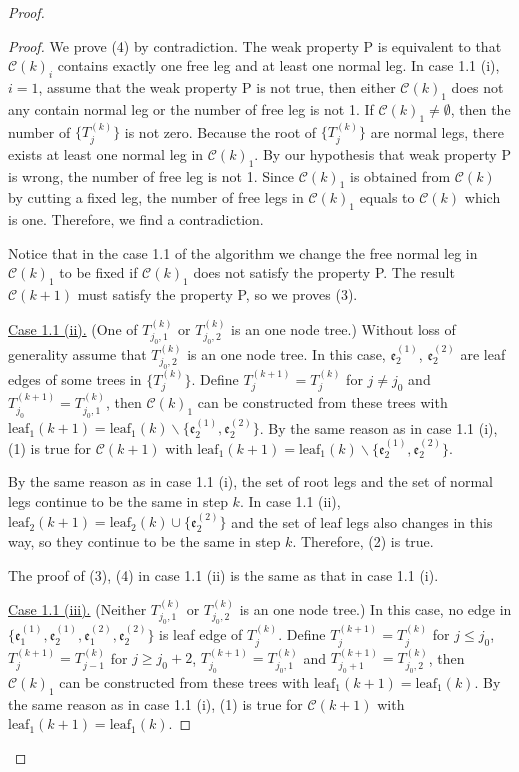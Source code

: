\begin{proof}
\begin{proof}
We prove (4) by contradiction. The weak property P is equivalent to that $\mathcal{C}(k)_i$ contains exactly one free leg and at least one normal leg. In case 1.1 (i), $i=1$, assume that the weak property P is not true, then either $\mathcal{C}(k)_1$ does not any contain normal leg or the number of free leg is not 1. If $\mathcal{C}(k)_1\ne \emptyset$, then the number of $\{T^{(k)}_{j}\}$ is not zero. Because the root of $\{T^{(k)}_{j}\}$ are normal legs, there exists at least one normal leg in $\mathcal{C}(k)_1$. By our hypothesis that weak property P is wrong, the number of free leg is not 1. Since $\mathcal{C}(k)_1$ is obtained from $\mathcal{C}(k)$ by cutting a fixed leg, the number of free legs in $\mathcal{C}(k)_1$ equals to  $\mathcal{C}(k)$ which is one. Therefore, we find a contradiction.

Notice that in the case 1.1 of the algorithm we change the free normal leg in $\mathcal{C}(k)_1$ to be fixed if $\mathcal{C}(k)_1$ does not satisfy the property P. The result $\mathcal{C}(k+1)$ must satisfy the property P, so we proves (3). 

\underline{Case 1.1 (ii).} (One of $T^{(k)}_{j_0,1}$ or $T^{(k)}_{j_0,2}$ is an one node tree.) Without loss of generality assume that $T^{(k)}_{j_0,2}$ is an one node tree. In this case, $\mathfrak{e}_{2}^{(1)}$, $\mathfrak{e}_{2}^{(2)}$ are leaf edges of some trees in $\{T_{j}^{(k)}\}$. Define $T^{(k+1)}_{j}=T^{(k)}_{j}$ for $j\ne j_0$ and $T^{(k+1)}_{j_0}=T^{(k)}_{j_0,1}$, then $\mathcal{C}(k)_1$ can be constructed from these trees with  $\text{leaf}_1(k+1)=\text{leaf}_1(k)\backslash\{\mathfrak{e}_{2}^{(1)}, \mathfrak{e}_{2}^{(2)}\}$. By the same reason as in case 1.1 (i), (1) is true for $\mathcal{C}(k+1)$ with $\text{leaf}_1(k+1)=\text{leaf}_1(k)\backslash\{\mathfrak{e}_{2}^{(1)}, \mathfrak{e}_{2}^{(2)}\}$.

By the same reason as in case 1.1 (i), the set of root legs and the set of normal legs continue to be the same in step $k$. In case 1.1 (ii), $\text{leaf}_2(k+1)=\text{leaf}_2(k)\cup \{ \mathfrak{e}_{2}^{(2)}\}$ and the set of leaf legs also changes in this way, so they continue to be the same in step $k$. Therefore, (2) is true.

The proof of (3), (4) in case 1.1 (ii) is the same as that in case 1.1 (i).


\underline{Case 1.1 (iii).} (Neither $T^{(k)}_{j_0,1}$ or $T^{(k)}_{j_0,2}$ is an one node tree.) In this case, no edge in $\{\mathfrak{e}_{1}^{(1)}, \mathfrak{e}_{2}^{(1)}, \mathfrak{e}_{1}^{(2)}, \mathfrak{e}_{2}^{(2)}\}$ is leaf edge of $T_{j}^{(k)}$. Define $T^{(k+1)}_{j}=T^{(k)}_{j}$ for $j\le j_0$, $T^{(k+1)}_{j}=T^{(k)}_{j-1}$ for $j\ge j_0+2$, $T^{(k+1)}_{j_0}=T^{(k)}_{j_0,1}$ and $T^{(k+1)}_{j_0+1}=T^{(k)}_{j_0,2}$, then $\mathcal{C}(k)_1$ can be constructed from these trees with  $\text{leaf}_1(k+1)=\text{leaf}_1(k)$. By the same reason as in case 1.1 (i), (1) is true for $\mathcal{C}(k+1)$ with $\text{leaf}_1(k+1)=\text{leaf}_1(k)$.


\end{proof}
\end{proof}
